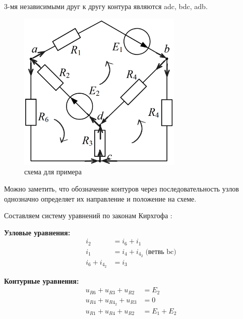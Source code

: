 3-мя независимыми друг к другу контура являются adc, bdc, adb.

\begin{figure}[H]
    \centering
    \includegraphics[width=0.7\textwidth]{images/Klaws_kontours_nodes.png}
    \caption{схема для примера}
    \label{fig:example}
\end{figure}

Можно заметить, что обозначение контуров через последовательность узлов однозначно определяет их направление и положение на схеме.


Составляем систему уравнений по законам Кирхгофа :

\textbf{Узловые уравнения:}
\begin{align}
    i_2 &= i_6 + i_1 \tag{a} \\
    i_1 &= i_4 + i_{4_2} \;\text{(ветвь bc)} \tag{b} \\
    i_6 + i_{4_2} &= i_3 \tag{c}
\end{align}

\textbf{Контурные уравнения:}
\begin{align}
    u_{R6} + u_{R3} + u_{R2} &= E_2 \tag{acd} \\
    u_{R4} + u_{R4_2} + u_{R3} &= 0 \tag{dbc} \\
    u_{R1} + u_{R4} + u_{R2} &= E_1 + E_2 \tag{abd}
\end{align}

